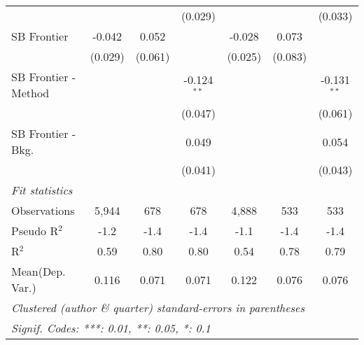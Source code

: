 \begin{tabular}{lcccccc}
                        &         &             & (0.029)       &         &             & (0.033)\\   
   SB Frontier          & -0.042  & 0.052       &               & -0.028  & 0.073       &   \\   
                        & (0.029) & (0.061)     &               & (0.025) & (0.083)     &   \\   
   SB Frontier - Method &         &             & -0.124$^{**}$ &         &             & -0.131$^{**}$\\   
                        &         &             & (0.047)       &         &             & (0.061)\\   
   SB Frontier - Bkg.   &         &             & 0.049         &         &             & 0.054\\   
                        &         &             & (0.041)       &         &             & (0.043)\\   
   \midrule
   \emph{Fit statistics}\\
   Observations         & 5,944   & 678         & 678           & 4,888   & 533         & 533\\  
   Pseudo R$^2$         & -1.2    & -1.4        & -1.4          & -1.1    & -1.4        & -1.4\\  
   R$^2$                & 0.59    & 0.80        & 0.80          & 0.54    & 0.78        & 0.79\\  
Mean(Dep. Var.) & 0.116 & 0.071 & 0.071 & 0.122 & 0.076 & 0.076 \\
   \midrule \midrule
   \multicolumn{7}{l}{\emph{Clustered (author \& quarter) standard-errors in parentheses}}\\
   \multicolumn{7}{l}{\emph{Signif. Codes: ***: 0.01, **: 0.05, *: 0.1}}\\
\end{tabular}
\par\endgroup
